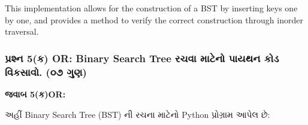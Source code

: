 This implementation allows for the construction of a BST by inserting
keys one by one, and provides a method to verify the correct
construction through inorder traversal.

\hypertarget{uxaaauxab0uxab6uxaa8-5uxa95-or-binary-search-tree-uxab0uxa9auxab5-uxaaeuxa9fuxaa8-uxaaauxaafuxaa5uxaa8-uxa95uxaa1-uxab5uxa95uxab8uxab5.-uxae6uxaed-uxa97uxaa3}{%
\subsubsection{પ્રશ્ન 5(ક) OR: Binary Search Tree રચવા માટેનો પાયથન કોડ
વિકસાવો. (૦૭
ગુણ)}\label{uxaaauxab0uxab6uxaa8-5uxa95-or-binary-search-tree-uxab0uxa9auxab5-uxaaeuxa9fuxaa8-uxaaauxaafuxaa5uxaa8-uxa95uxaa1-uxab5uxa95uxab8uxab5.-uxae6uxaed-uxa97uxaa3}}

\textbf{જવાબ 5(ક)OR:}

અહીં Binary Search Tree (BST) ની રચના માટેનો Python પ્રોગ્રામ આપેલ છે:

